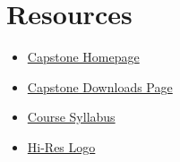 \documentclass[11pt,a4paper,oneside]{article}
\begin{document}
\section{Resources}
\begin{itemize}
\item \href{http://www.capstone.cse.msu.edu/2012-01/home/}{Capstone Homepage}
\item \href{http://www.cse.msu.edu/~cse498/2012-01/other-links/downloads/}{Capstone Downloads Page}
\item \href{http://www.capstone.cse.msu.edu/2012-01/other-links/syllabus/}{Course Syllabus}
\item \href{http://www.capstone.cse.msu.edu/2012-01/projects/urban-science/images/originals/sponsor-logo.png}{Hi-Res Logo}
\end{itemize}
\end{document}
